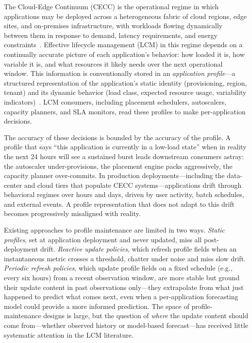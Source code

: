 \documentclass[manuscript,screen,review,anonymous]{acmart}
\begin{document}
The Cloud-Edge Continuum (CECC) is the operational regime in which
applications may be deployed across a heterogeneous fabric of cloud
regions, edge sites, and on-premises infrastructure, with workloads
flowing dynamically between them in response to demand, latency
requirements, and energy constraints~\citep{ullah_cecc_survey_2023}.
Effective lifecycle management (LCM) in this regime depends on a
continually accurate picture of each application's behavior: how loaded
it is, how variable it is, and what resources it likely needs over the
next operational window. This information is conventionally stored in an
\emph{application profile}---a structured representation of the
application's static identity (provisioning, region, tenant) and its
dynamic behavior (load class, expected resource usage, variability
indicators)~\citep{nfv_sdn_apm}. LCM consumers, including placement
schedulers, autoscalers, capacity planners, and SLA monitors, read these
profiles to make per-application decisions.

The accuracy of these decisions is bounded by the accuracy of the profile.
A profile that says ``this application is currently in a low-load state''
when in reality the next 24 hours will see a sustained burst leads
downstream consumers astray: the autoscaler under-provisions, the placement
engine packs aggressively, the capacity planner over-commits. In production
deployments---including the data-center and cloud tiers that populate
CECC systems---applications drift through behavioral regimes over hours
and days, driven by user activity, batch schedules, and external events.
A profile representation that does not adapt to this drift becomes
progressively misaligned with reality.

Existing approaches to profile maintenance are limited in two ways.
\emph{Static profiles}, set at application deployment and never updated,
miss all post-deployment drift. \emph{Reactive update policies}, which
refresh profile fields when an instantaneous metric crosses a threshold,
chatter under noise and miss slow drift. \emph{Periodic refresh policies},
which update profile fields on a fixed schedule (e.g., every six hours)
from a recent observation window, are more stable but ground their update
content in past observations only---they extrapolate from what just
happened to predict what comes next, even when a per-application
forecasting model could provide a more informed prediction. The space of
profile-maintenance designs is large, but the question of \emph{where}
the update content should come from---whether observed history or
model-based forecast---has received little systematic attention in the
LCM literature.
\end{document}
